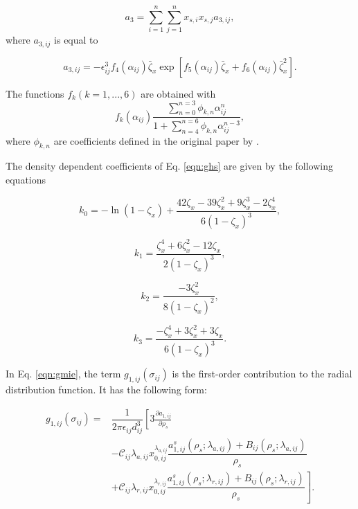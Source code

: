 \begin{equation}
a_{3} = \sum_{i=1}^{n} \sum_{j=1}^{n} x_{s,i} x_{s,j} a_{3,ij},
\end{equation}	
where $a_{3,ij}$ is equal to

\begin{equation}
a_{3,ij} = - \epsilon _{ij}^{3} f_{4}(\alpha_{ij}) \bar{\zeta}_{x} \exp[f_{5}(\alpha_{ij}) \bar{\zeta}_{x}+ f_{6}(\alpha_{ij}) \bar{\zeta}_{x}^{2}].
\end{equation}

The functions $f_{k}(k=1,...,6)$ are obtained with
\begin{equation}
f_{k}(\alpha_{ij}) \dfrac{\sum_{n=0}^{n=3} \phi_{k,n} \alpha_{ij}^{n}}{1+ \sum_{n=4}^{n=6} \phi_{k,n} \alpha_{ij}^{n-3}},
\end{equation}
where $\phi_{k,n}$ are coefficients defined in the original paper by .

The density dependent coefficients of Eq. \ref{eqn:ghs} are given by the following equations

\begin{equation}
k_{0} = - \ln(1-{\zeta}_{x}) + \frac{42{\zeta}_{x} -39{\zeta}_{x}^{2}+ 9{\zeta}_{x}^{3}-2{\zeta}_{x}^{4}}{6(1-\zeta_{x})^{3}},
\end{equation}

\begin{equation}
k_{1} = \frac{{\zeta}_{x}^{4} +6{\zeta}_{x}^{2}- 12{\zeta}_{x}}{2(1-\zeta_{x})^{3}},
\end{equation}

\begin{equation}
k_{2} = \frac{-3{\zeta}_{x}^{2}}{8(1-\zeta_{x})^{2}},
\end{equation}

\begin{equation}
k_{3} = \frac{-{\zeta}_{x}^{4}+3{\zeta}_{x}^{2}+3{\zeta}_{x}}{6(1-\zeta_{x})^{3}}.
\end{equation}

In Eq. \ref{eqn:gmie}, the term $g_{1,ij}(\sigma_{ij})$ is the first-order contribution to the radial distribution function. It has the following form:

\begin{equation}
\begin{aligned}
g_{1,ij}(\sigma_{ij}) {}=& \dfrac{1}{2 \pi \epsilon_{ij} d _{ij}^{3}} \left[ 3 \frac{\partial a_{1,ij}}{\partial \rho _{s}} \right. \\
& \left.  - \mathcal{C}_{ij} \lambda_{a,ij} x_{0,ij}^{\lambda_{a,ij}} \dfrac{a_{1,ij}^{s}(\rho_{s};\lambda_{a,ij})+B_{ij}(\rho_{s};\lambda_{a,ij})}{\rho _{s}} \right. \\
& \left.  + \mathcal{C}_{ij} \lambda_{r,ij} x_{0,ij}^{\lambda_{r,ij}} \dfrac{a_{1,ij}^{s}(\rho_{s};\lambda_{r,ij})+B_{ij}(\rho_{s};\lambda_{r,ij})}{\rho _{s}} \right].
\end{aligned}
\end{equation} 

